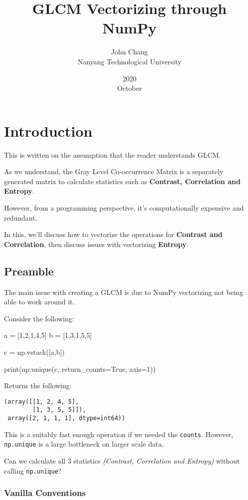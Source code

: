 \documentclass[article,oneside]{memoir}
\title{GLCM Vectorizing through NumPy}
\date{2020\\ October}
\author{John Chang\\ Nanyang Technological University}
\begin{document}
\maketitle
\newpage

\chapter{Introduction}

This is written on the assumption that the reader understands GLCM.

As we understand, the Gray Level Co-occurrence Matrix is a separately generated matrix to calculate statistics such as \textbf{Contrast, Correlation and Entropy}.

However, from a programming perspective, it's computationally expensive and redundant.

In this, we'll discuss how to vectorize the operations for \textbf{Contrast and Correlation}, then discuss issues with vectorizing \textbf{Entropy}.

\section{Preamble}

The main issue with creating a GLCM is due to NumPy vectorizing not being able to work around it.

Consider the following:

\begin{python}
a = [1,2,1,4,5]
b = [1,3,1,5,5]

c = np.vstack([a,b])

print(np.unique(c, return_counts=True, axis=1))
\end{python}

Returns the following:

\begin{verbatim}
(array([[1, 2, 4, 5],
        [1, 3, 5, 5]]),
 array([2, 1, 1, 1], dtype=int64))
\end{verbatim}

This is a suitably fast enough operation if we needed the \verb+counts+. However, \verb+np.unique+ is a large bottleneck on larger scale data.

Can we calculate all 3 statistics \textit{(Contrast, Correlation and Entropy)} without calling \verb+np.unique+?

\subsection{Vanilla Conventions}
\end{document}
